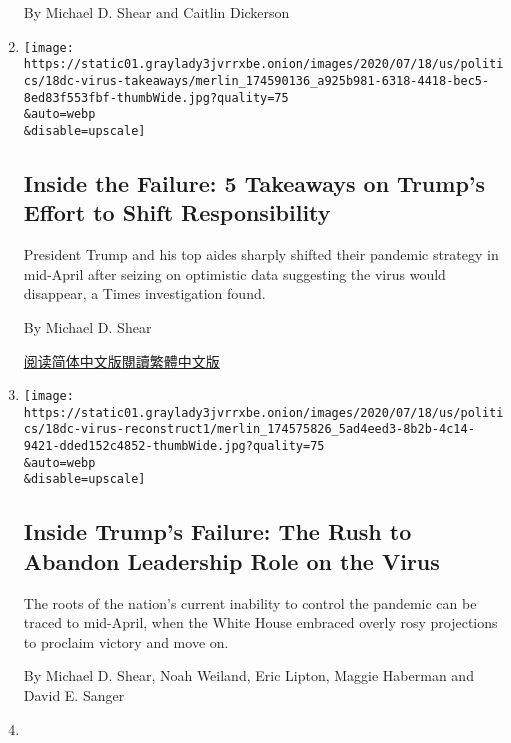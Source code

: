 \begin{enumerate}
  By Michael D. Shear and Caitlin Dickerson
\item
  \href{/2020/07/18/us/politics/trump-coronavirus-failure-takeaways.html}{}

  \texttt{[image: https://static01.graylady3jvrrxbe.onion/images/2020/07/18/us/politics/18dc-virus-takeaways/merlin\_174590136\_a925b981-6318-4418-bec5-8ed83f553fbf-thumbWide.jpg?quality=75\\\&auto=webp\\\&disable=upscale]}

  \hypertarget{inside-the-failure-5-takeaways-on-trumps-effort-to-shift-responsibility}{%
  \subsection{Inside the Failure: 5 Takeaways on Trump's Effort to Shift
  Responsibility}\label{inside-the-failure-5-takeaways-on-trumps-effort-to-shift-responsibility}}

  President Trump and his top aides sharply shifted their pandemic
  strategy in mid-April after seizing on optimistic data suggesting the
  virus would disappear, a Times investigation found.

  By Michael D. Shear

  \href{https://cn.nytimes3xbfgragh.onion/usa/20200720/trump-coronavirus-failure-takeaways/}{阅读简体中文版}\href{https://cn.nytimes3xbfgragh.onion/usa/20200720/trump-coronavirus-failure-takeaways/zh-hant/}{閱讀繁體中文版}
\item
  \href{/2020/07/18/us/politics/trump-coronavirus-response-failure-leadership.html}{}

  \texttt{[image: https://static01.graylady3jvrrxbe.onion/images/2020/07/18/us/politics/18dc-virus-reconstruct1/merlin\_174575826\_5ad4eed3-8b2b-4c14-9421-dded152c4852-thumbWide.jpg?quality=75\\\&auto=webp\\\&disable=upscale]}

  \hypertarget{inside-trumps-failure-the-rush-to-abandon-leadership-role-on-the-virus}{%
  \subsection{Inside Trump's Failure: The Rush to Abandon Leadership
  Role on the
  Virus}\label{inside-trumps-failure-the-rush-to-abandon-leadership-role-on-the-virus}}

  The roots of the nation's current inability to control the pandemic
  can be traced to mid-April, when the White House embraced overly rosy
  projections to proclaim victory and move on.

  By Michael D. Shear, Noah Weiland, Eric Lipton, Maggie Haberman and
  David E. Sanger
\item
  \href{/2020/07/14/us/politics/trump-news-conference.html}{}


\end{enumerate}
